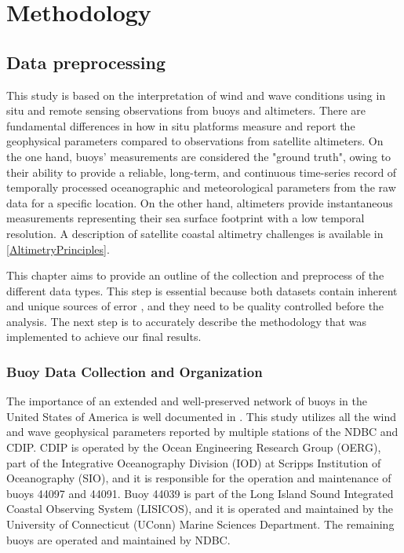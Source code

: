 
\chapter{Methodology} %

\label{Chapter4} %


\section{Data preprocessing}

This study is based on the interpretation of wind and wave conditions using in situ and remote sensing observations from buoys and altimeters. There are fundamental differences in how in situ platforms measure and report the geophysical parameters compared to observations from satellite altimeters. On the one hand, buoys' measurements are considered the "ground truth", owing to their ability to provide a reliable, long-term, and continuous time-series record of temporally processed oceanographic and meteorological parameters from the raw data for a specific location. On the other hand, altimeters provide instantaneous measurements representing their sea surface footprint with a low temporal resolution. A description of satellite coastal altimetry challenges is available in \ref{AltimetryPrinciples}. 

This chapter aims to provide an outline of the collection and preprocess of the different data types. This step is essential because both datasets contain inherent and unique sources of error \cite{Glazman1990, Monaldo1988, Zieger2009}, and they need to be quality controlled before the analysis. The next step is to accurately describe the methodology that was implemented to achieve our final results. 




\subsection{Buoy Data Collection and Organization}\label{buoy_observations}

The importance of an extended and well-preserved network of buoys in the United States of America is well documented in \cite{Castellini2011}. This study utilizes all the wind and wave geophysical parameters reported by multiple stations of the NDBC and CDIP. CDIP is operated by the Ocean Engineering Research Group (OERG), part of the Integrative Oceanography Division (IOD) at Scripps Institution of Oceanography (SIO), and it is responsible for the operation and maintenance of buoys 44097 and 44091. Buoy 44039 is part of the Long Island Sound Integrated Coastal Observing System (LISICOS), and it is operated and maintained by the University of Connecticut (UConn) Marine Sciences Department. The remaining buoys are operated and maintained by NDBC.



